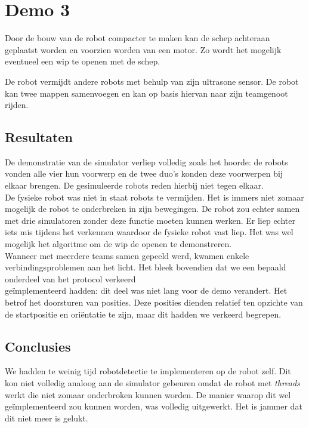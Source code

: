 \documentclass[eind]{penoverslag}
\begin{document}
\section{Demo 3}
\label{Asec:demo3}
Door de bouw van de robot compacter te maken kan de schep achteraan geplaatst worden en voorzien worden van een motor. Zo wordt het mogelijk eventueel een wip te openen met de schep.

De robot vermijdt andere robots met behulp van zijn ultrasone sensor. De robot kan twee mappen samenvoegen en kan op basis hiervan naar zijn teamgenoot rijden.

\subsection{Resultaten}
\label{Assec:result3}
De demonstratie van de simulator verliep volledig zoals het hoorde: de robots vonden alle vier hun voorwerp en de twee duo's konden deze voorwerpen bij elkaar brengen. De gesimuleerde robots reden hierbij niet tegen elkaar.\\

De fysieke robot was niet in staat robots te vermijden. Het is immers niet zomaar mogelijk de robot te onderbreken in zijn bewegingen. De robot zou echter samen met drie simulatoren zonder deze functie moeten kunnen werken. Er liep echter iets mis tijdens het verkennen waardoor de fysieke robot vast liep.
Het was wel mogelijk het algoritme om de wip de openen te demonstreren.\\

Wanneer met meerdere teams samen gepeeld werd, kwamen enkele verbindingsproblemen aan het licht. Het bleek bovendien dat we een bepaald onderdeel van het protocol verkeerd \\ge\"implementeerd hadden: dit deel was niet lang voor de demo verandert. Het betrof het doorsturen van posities. Deze posities dienden relatief ten opzichte van de startpositie en ori\"entatie te zijn, maar dit hadden we verkeerd begrepen.

\subsection{Conclusies}
\label{Assec:conc3}
We hadden te weinig tijd robotdetectie te implementeren op de robot zelf. Dit kon niet volledig analoog aan de simulator gebeuren omdat de robot met \textit{threads} werkt die niet zomaar onderbroken kunnen worden. De manier waarop dit wel ge\"implementeerd zou kunnen worden, was volledig uitgewerkt. Het is jammer dat dit niet meer is gelukt.
\end{document}
